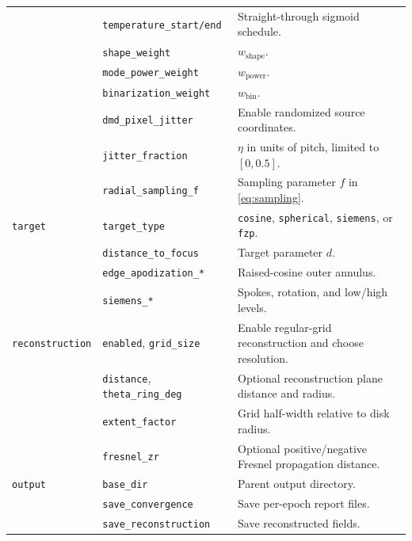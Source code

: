\documentclass[11pt,a4paper]{article}
\begin{document}
\begin{longtable}{@{}p{31mm}p{37mm}p{79mm}@{}}
 & \texttt{temperature\_start/end} & Straight-through sigmoid schedule. \\
 & \texttt{shape\_weight} & $w_{\mathrm{shape}}$. \\
 & \texttt{mode\_power\_weight} & $w_{\mathrm{power}}$. \\
 & \texttt{binarization\_weight} & $w_{\mathrm{bin}}$. \\
 & \texttt{dmd\_pixel\_jitter} & Enable randomized source coordinates. \\
 & \texttt{jitter\_fraction} & $\eta$ in units of pitch, limited to $[0,0.5]$. \\
 & \texttt{radial\_sampling\_f} & Sampling parameter $f$ in \cref{eq:sampling}. \\
\addlinespace
\texttt{target} & \texttt{target\_type} & \texttt{cosine}, \texttt{spherical}, \texttt{siemens}, or \texttt{fzp}. \\
 & \texttt{distance\_to\_focus} & Target parameter $d$. \\
 & \texttt{edge\_apodization\_*} & Raised-cosine outer annulus. \\
 & \texttt{siemens\_*} & Spokes, rotation, and low/high levels. \\
\addlinespace
\texttt{reconstruction} & \texttt{enabled}, \texttt{grid\_size} & Enable regular-grid reconstruction and choose resolution. \\
 & \texttt{distance}, \texttt{theta\_ring\_deg} & Optional reconstruction plane distance and radius. \\
 & \texttt{extent\_factor} & Grid half-width relative to disk radius. \\
 & \texttt{fresnel\_zr} & Optional positive/negative Fresnel propagation distance. \\
\addlinespace
\texttt{output} & \texttt{base\_dir} & Parent output directory. \\
 & \texttt{save\_convergence} & Save per-epoch report files. \\
 & \texttt{save\_reconstruction} & Save reconstructed fields. \\
\bottomrule
\end{longtable}
\end{document}
